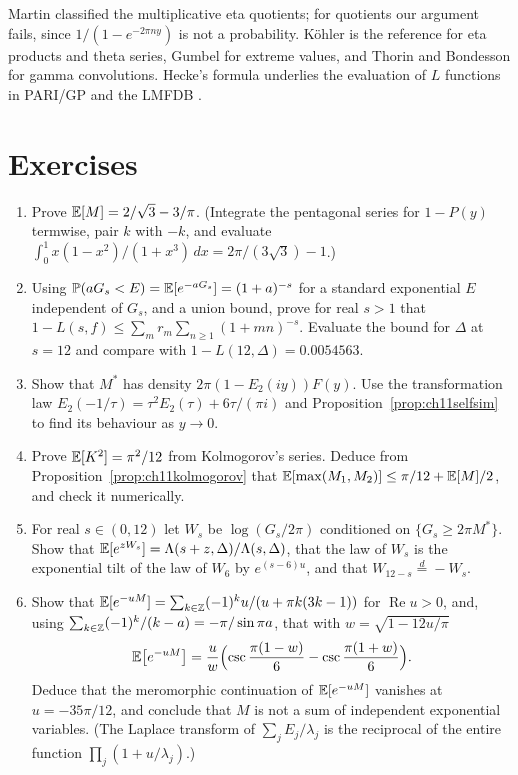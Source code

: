 Martin \cite{martin1996} classified the multiplicative eta quotients; for quotients our argument fails, since $1/(1-e^{-2\pi ny})$ is not a probability. K\"ohler \cite{koehler2011} is the reference for eta products and theta series, Gumbel \cite{gumbel1958} for extreme values, and Thorin \cite{thorin1977} and Bondesson \cite{bondesson1992} for gamma convolutions. Hecke's formula underlies the evaluation of $L$ functions in PARI/GP and the LMFDB \cite{lmfdb}.

\section{Exercises}

\begin{enumerate}
\item\label{ex:ch11mean} Prove $\mathbb{E}[M]=2/\sqrt3-3/\pi$. (Integrate the pentagonal series for $1-P(y)$ termwise, pair $k$ with $-k$, and evaluate $\int_0^1x(1-x^2)/(1+x^3)\,dx=2\pi/(3\sqrt3)-1$.)

\item Using $\mathbb{P}(aG_s<E)=\mathbb{E}[e^{-aG_s}]=(1+a)^{-s}$ for a standard exponential $E$ independent of $G_s$, and a union bound, prove for real $s>1$ that $1-L(s,f)\le\sum_mr_m\sum_{n\ge1}(1+mn)^{-s}$. Evaluate the bound for $\Delta$ at $s=12$ and compare with $1-L(12,\Delta)=0.0054563$.

\item Show that $M^*$ has density $2\pi(1-E_2(iy))F(y)$. Use the transformation law $E_2(-1/\tau)=\tau^2E_2(\tau)+6\tau/(\pi i)$ and Proposition~\ref{prop:ch11selfsim} to find its behaviour as $y\to0$.

\item Prove $\mathbb{E}[K^2]=\pi^2/12$ from Kolmogorov's series. Deduce from Proposition~\ref{prop:ch11kolmogorov} that $\mathbb{E}[\max(M_1,M_2)]\le\pi/12+\mathbb{E}[M]/2$, and check it numerically.

\item For real $s\in(0,12)$ let $W_s$ be $\log(G_s/2\pi)$ conditioned on $\{G_s\ge2\pi M^*\}$. Show that $\mathbb{E}[e^{zW_s}]=\Lambda(s+z,\Delta)/\Lambda(s,\Delta)$, that the law of $W_s$ is the exponential tilt of the law of $W_6$ by $e^{(s-6)u}$, and that $W_{12-s}\overset{d}{=}-W_s$.

\item\label{ex:ch11laplace} Show that $\mathbb{E}[e^{-uM}]=\sum_{k\in\mathbb{Z}}(-1)^ku/(u+\pi k(3k-1))$ for $\operatorname{Re}u>0$, and, using $\sum_{k\in\mathbb{Z}}(-1)^k/(k-a)=-\pi/\sin\pi a$, that with $w=\sqrt{1-12u/\pi}$
\[
\mathbb{E}\bigl[e^{-uM}\bigr]=\frac uw\Bigl(\csc\frac{\pi(1-w)}6-\csc\frac{\pi(1+w)}6\Bigr).
\]
Deduce that the meromorphic continuation of $\mathbb{E}[e^{-uM}]$ vanishes at $u=-35\pi/12$, and conclude that $M$ is not a sum of independent exponential variables. (The Laplace transform of $\sum_jE_j/\lambda_j$ is the reciprocal of the entire function $\prod_j(1+u/\lambda_j)$.)
\end{enumerate}

